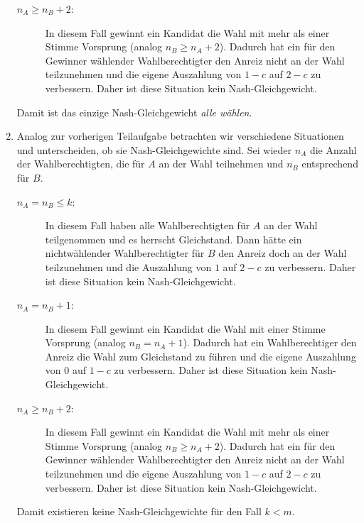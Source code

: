 \begin{enumerate}
\begin{description}
      \item[$n_A \geq n_B + 2$:] In diesem Fall gewinnt ein Kandidat die Wahl mit mehr als
        einer Stimme Vorsprung (analog $n_B \geq n_A+2$).
        Dadurch hat ein für den Gewinner wählender Wahlberechtigter den Anreiz nicht an
        der Wahl teilzunehmen und die eigene Auszahlung von $1-c$ auf $2-c$ zu verbessern.
        Daher ist diese Situation kein Nash-Gleichgewicht.
    \end{description}
    Damit ist das einzige Nash-Gleichgewicht \emph{alle wählen}.

  \item Analog zur vorherigen Teilaufgabe betrachten wir verschiedene Situationen und
    unterscheiden, ob sie Nash-Gleichgewichte sind.
    Sei wieder $n_A$ die Anzahl der Wahlberechtigten, die für $A$ an der Wahl teilnehmen
    und $n_B$ entsprechend für $B$.

    \begin{description}
      \item[$n_A = n_B \leq k$:] In diesem Fall haben alle Wahlberechtigten für $A$ an der
        Wahl teilgenommen und es herrscht Gleichstand.
        Dann hätte ein nichtwählender Wahlberechtigter für $B$ den Anreiz doch an der Wahl
        teilzunehmen und die Auszahlung von $1$ auf $2-c$ zu verbessern.
        Daher ist diese Situation kein Nash-Gleichgewicht.

      \item[$n_A = n_B + 1$:] In diesem Fall gewinnt ein Kandidat die Wahl mit einer
        Stimme Vorsprung (analog $n_B = n_A + 1$).
        Dadurch hat ein Wahlberechtiger den Anreiz die Wahl zum Gleichstand zu führen und
        die eigene Auszahlung von $0$ auf $1-c$ zu verbessern.
        Daher ist diese Situation kein Nash-Gleichgewicht.

      \item[$n_A \geq n_B + 2$:] In diesem Fall gewinnt ein Kandidat die Wahl mit mehr als
        einer Stimme Vorsprung (analog $n_B \geq n_A+2$).
        Dadurch hat ein für den Gewinner wählender Wahlberechtigter den Anreiz nicht an
        der Wahl teilzunehmen und die eigene Auszahlung von $1-c$ auf $2-c$ zu verbessern.
        Daher ist diese Situation kein Nash-Gleichgewicht.
    \end{description}

    Damit existieren keine Nash-Gleichgewichte für den Fall $k<m$.
\end{enumerate}
